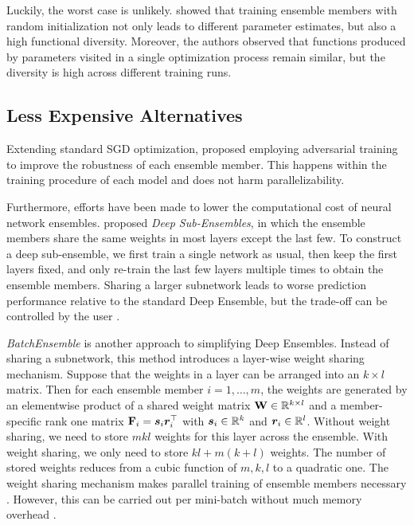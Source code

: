 Luckily, the worst case is unlikely. \cite{fortDeepEnsemblesLoss2020} showed that training ensemble members with random initialization not only leads to different parameter estimates, but also a high functional diversity. Moreover, the authors observed that functions produced by parameters visited in a single optimization process remain similar, but the diversity is high across different training runs.

\subsection{Less Expensive Alternatives}

Extending standard SGD optimization, \cite{lakshminarayananSimpleScalablePredictive2017b} proposed employing adversarial training to improve the robustness of each ensemble member. This happens within the training procedure of each model and does not harm parallelizability.

Furthermore, efforts have been made to lower the computational cost of neural network ensembles. \cite{valdenegro-toroDeepSubEnsemblesFast2019} proposed \emph{Deep Sub-Ensembles}, in which the ensemble members share the same weights in most layers except the last few. To construct a deep sub-ensemble, we first train a single network as usual, then keep the first layers fixed, and only re-train the last few layers multiple times to obtain the ensemble members. Sharing a larger subnetwork leads to worse prediction performance relative to the standard Deep Ensemble, but the trade-off can be controlled by the user \citep{valdenegro-toroDeepSubEnsemblesFast2019}.

\emph{BatchEnsemble} \citep{wenBatchEnsembleAlternativeApproach2019} is another approach to simplifying Deep Ensembles. Instead of sharing a subnetwork, this method introduces a layer-wise weight sharing mechanism. Suppose that the weights in a layer can be arranged into an $k \times l$ matrix. Then for each ensemble member $i = 1,\dots,m$, the weights are generated by an elementwise product of a shared weight matrix $\bm{\mathbf{W}} \in \mathbb{R}^{k \times l}$ and a member-specific rank one matrix $\bm{\mathbf{F}}_i = \bm{s}_i \bm{r}_i^\top$ with $\bm{s}_i \in \mathbb{R}^k$ and $\bm{r}_i \in \mathbb{R}^l$. Without weight sharing, we need to store $m k l$ weights for this layer across the ensemble. With weight sharing, we only need to store $k l + m(k + l)$ weights. The number of stored weights reduces from a cubic function of $m,k,l$ to a quadratic one. The weight sharing mechanism makes parallel training of ensemble members necessary \citep{gawlikowskiSurveyUQ2023}. However, this can be carried out per mini-batch without much memory overhead \citep{wenBatchEnsembleAlternativeApproach2019}. 


